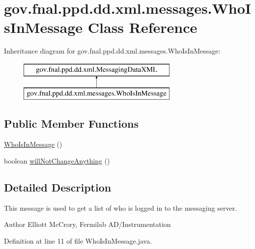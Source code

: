\hypertarget{classgov_1_1fnal_1_1ppd_1_1dd_1_1xml_1_1messages_1_1WhoIsInMessage}{\section{gov.\-fnal.\-ppd.\-dd.\-xml.\-messages.\-Who\-Is\-In\-Message Class Reference}
\label{classgov_1_1fnal_1_1ppd_1_1dd_1_1xml_1_1messages_1_1WhoIsInMessage}
}
Inheritance diagram for gov.\-fnal.\-ppd.\-dd.\-xml.\-messages.\-Who\-Is\-In\-Message\-:\begin{figure}[H]
\begin{center}
\leavevmode
\includegraphics[height=2.000000cm]{classgov_1_1fnal_1_1ppd_1_1dd_1_1xml_1_1messages_1_1WhoIsInMessage}
\end{center}
\end{figure}
\subsection*{Public Member Functions}
\begin{DoxyCompactItemize}
\item 
\hyperlink{classgov_1_1fnal_1_1ppd_1_1dd_1_1xml_1_1messages_1_1WhoIsInMessage_a1d331a1eddc7d2668e566161a6ca3806}{Who\-Is\-In\-Message} ()
\item 
boolean \hyperlink{classgov_1_1fnal_1_1ppd_1_1dd_1_1xml_1_1messages_1_1WhoIsInMessage_a94708dd1583a22b4779d3f3f1ecad023}{will\-Not\-Change\-Anything} ()
\end{DoxyCompactItemize}


\subsection{Detailed Description}
This message is used to get a list of who is logged in to the messaging server.

\begin{DoxyAuthor}{Author}
Elliott Mc\-Crory, Fermilab A\-D/\-Instrumentation 
\end{DoxyAuthor}


Definition at line 11 of file Who\-Is\-In\-Message.\-java.



